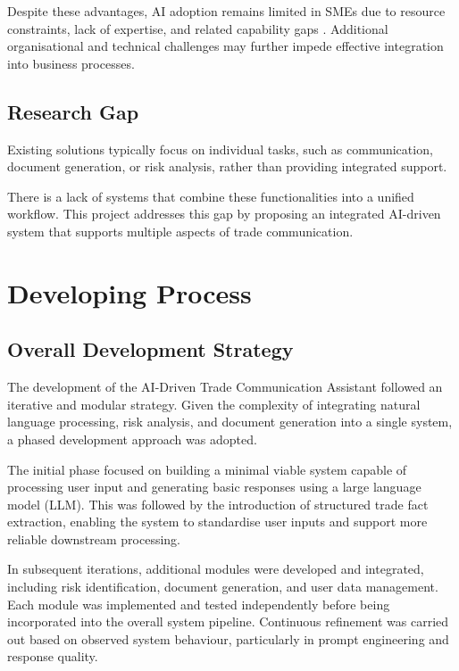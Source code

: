 \documentclass[12pt,a4paper]{report}
\begin{document}
Despite these advantages, AI adoption remains limited in SMEs due to resource constraints, lack of expertise, and related capability gaps \citep{oecd2021}. Additional organisational and technical challenges may further impede effective integration into business processes.

\section{Research Gap}

Existing solutions typically focus on individual tasks, such as communication, document generation, or risk analysis, rather than providing integrated support.

There is a lack of systems that combine these functionalities into a unified workflow. This project addresses this gap by proposing an integrated AI-driven system that supports multiple aspects of trade communication.


\chapter{Developing Process}

\section{Overall Development Strategy}

The development of the AI-Driven Trade Communication Assistant followed an iterative and modular strategy. Given the complexity of integrating natural language processing, risk analysis, and document generation into a single system, a phased development approach was adopted.

The initial phase focused on building a minimal viable system capable of processing user input and generating basic responses using a large language model (LLM). This was followed by the introduction of structured trade fact extraction, enabling the system to standardise user inputs and support more reliable downstream processing.

In subsequent iterations, additional modules were developed and integrated, including risk identification, document generation, and user data management. Each module was implemented and tested independently before being incorporated into the overall system pipeline. Continuous refinement was carried out based on observed system behaviour, particularly in prompt engineering and response quality.
\end{document}
